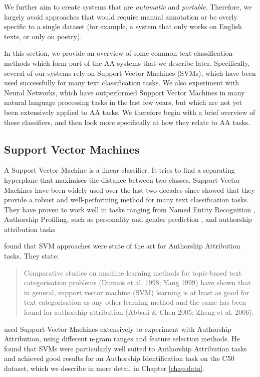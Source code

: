 We further aim to create systems that are \textit{automatic} and \textit{portable}. Therefore, we largely avoid approaches that would require manual annotation or be overly specific to a single dataset (for example, a system that only works on English texts, or only on poetry). 

In this section, we provide an overview of some common text classification methods which form part of the AA systems that we describe later. Specifically, several of our systems rely on Support Vector Machines (SVMs), which have been used successfully for many text classification tasks. We also experiment with Neural Networks, which have outperformed Support Vector Machines in many natural language processing tasks in the last few years, but which are not yet been extensively applied to AA tasks. We therefore begin with a brief overview of these classifiers, and then look more specifically at how they relate to AA tasks.

\subsection{Support Vector Machines}

A Support Vector Machine is a linear classifier. It tries to find a separating hyperplane that maximises the distance between two classes. Support Vector Machines have been widely used over the last two decades since \citet{joachims1998text} showed that they provide a robust and well-performing method for many text classification tasks. They have proven to work well in tasks ranging from Named Entity Recognition \cite{Kravalova:2009:CNE:1699705.1699748}, Authorship Profiling, such as personality and gender prediction \cite{verhoeven2016twisty,busgeropvollenbroeck:2016}, and authorship attribution tasks \cite{hurlimann2015glad,diederich2003authorship,koppel2003exploiting}

\citet{koppel2009computational} found that SVM approaches were state of the art for Authorship Attribution tasks. They state:
\begin{quote}
Comparative studies on machine learning methods for topic-based text categorisation problems (Dumais et al. 1998; Yang 1999) have shown that in general, support vector machine (SVM) learning is at least as good for text categorisation as any other learning method and the same has been found for authorship attribution (Abbasi \& Chen 2005; Zheng et al. 2006).
\end{quote}

\citet{houvardas2006ngram} used Support Vector Machines extensively to experiment with Authorship Attribution, using different n-gram ranges and feature selection methods. He found that SVMs were particularly well suited to Authorship Attribution tasks and achieved good results for an Authorship Identification task on the C50 dataset, which we describe in more detail in Chapter \ref{chap:data}. 

